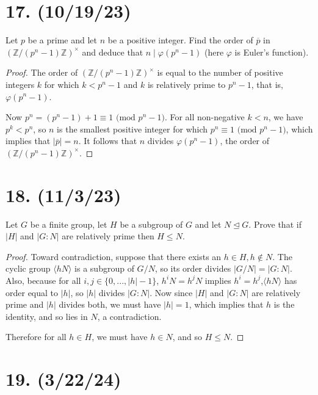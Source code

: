 \documentclass{article}
\begin{document}
\section*{17. (10/19/23)}

Let $p$ be a prime and let $n$ be a positive integer. Find the order of $\overline{p}$ in \\ $(\mathbb{Z}/(p^n - 1)\mathbb{Z})^\times$ and deduce that $n \mid \varphi(p^n - 1)$ (here $\varphi$ is Euler's function).

\begin{proof}
    The order of $(\mathbb{Z}/(p^n - 1)\mathbb{Z})^\times$ is equal to the number of positive integers $k$ for which $k < p^n - 1$ and $k$ is relatively prime to $p^n - 1$, that is, $\varphi(p^n - 1)$.

    Now $p^n = (p^n - 1) + 1 \equiv 1 \text{ (mod $p^n - 1$)}$. For all non-negative $k < n$, we have $p^k < p^n$, so $n$ is the smallest positive integer for which $p^n \equiv 1 \text{ (mod $p^n - 1$)}$, which implies that $|\overline{p}| = n$. It follows that $n$ divides $\varphi(p^n - 1)$, the order of $(\mathbb{Z}/(p^n - 1)\mathbb{Z})^\times$.
\end{proof}

\section*{18. (11/3/23)}

Let $G$ be a finite group, let $H$ be a subgroup of $G$ and let $N \unlhd G$. Prove that if $|H|$ and $|G:N|$ are relatively prime then $H \leq N$.

\begin{proof}
    Toward contradiction, suppose that there exists an $h \in H, h \notin N$. The cyclic group $\langle hN \rangle$ is a subgroup of $G/N$, so its order divides $|G/N| = |G:N|$. Also, because for all $i, j \in \{ 0, ..., |h| - 1 \}$, $h^i N = h^j N$ implies $h^i = h^j$,$\langle hN \rangle$ has order equal to $|h|$, so $|h|$ divides $|G:N|$. Now since $|H|$ and $|G:N|$ are relatively prime and $|h|$ divides both, we must have $|h| = 1$, which implies that $h$ is the identity, and so lies in $N$, a contradiction.

    Therefore for all $h \in H$, we must have $h \in N$, and so $H \leq N$.
\end{proof}

\section*{19. (3/22/24)}
\end{document}
